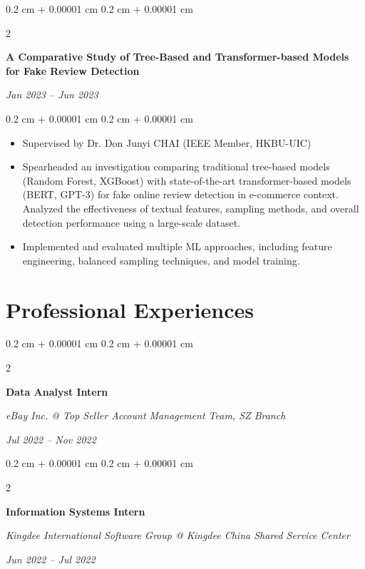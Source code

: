 \documentclass[10pt, letterpaper]{article}
\newenvironment{highlights}{
    \begin{itemize}[
        topsep=0.10 cm,
        parsep=0.10 cm,
        partopsep=0pt,
        itemsep=0pt,
        leftmargin=0.4 cm + 10pt
    ]
}{
    \end{itemize}
} %
\newenvironment{onecolentry}{
    \begin{adjustwidth}{
        0.2 cm + 0.00001 cm
    }{
        0.2 cm + 0.00001 cm
    }
}{
    \end{adjustwidth}
} %
\newenvironment{twocolentry}[2][]{
    \onecolentry
    \def\secondColumn{#2}
    \setcolumnwidth{\fill, 4.5 cm}
    \begin{paracol}{2}
}{
    \switchcolumn \raggedleft \secondColumn
    \end{paracol}
    \endonecolentry
} %
\begin{document}
        \vspace{0.2 cm}

        \begin{twocolentry}{
        \textit{Jan 2023 – Jun 2023}}
            \textbf{A Comparative Study of Tree-Based and Transformer-based Models for Fake Review Detection}
        \end{twocolentry}

        \vspace{0.10 cm}
        \begin{onecolentry}
            \begin{highlights}
                \item Supervised by Dr. Don Junyi CHAI (IEEE Member, HKBU-UIC)
                \item Spearheaded an investigation comparing traditional tree-based models (Random Forest, XGBoost) with state-of-the-art transformer-based models (BERT, GPT-3) for fake online review detection in e-commerce context. Analyzed the effectiveness of textual features, sampling methods, and overall detection performance using a large-scale dataset.
                \item Implemented and evaluated multiple ML approaches, including feature engineering, balanced sampling techniques, and model training.
            \end{highlights}
        \end{onecolentry}

    \section{Professional Experiences}

        \begin{twocolentry}{
        \textit{Jul 2022 – Nov 2022}}
            \textbf{Data Analyst Intern}

            \textit{eBay Inc. @ Top Seller Account Management Team, SZ Branch}
        \end{twocolentry}

        \vspace{0.2 cm}

        \begin{twocolentry}{
        \textit{Jun 2022 – Jul 2022}}
            \textbf{Information Systems Intern}

            \textit{Kingdee International Software Group @ Kingdee China Shared Service Center}
        \end{twocolentry}
\end{document}
